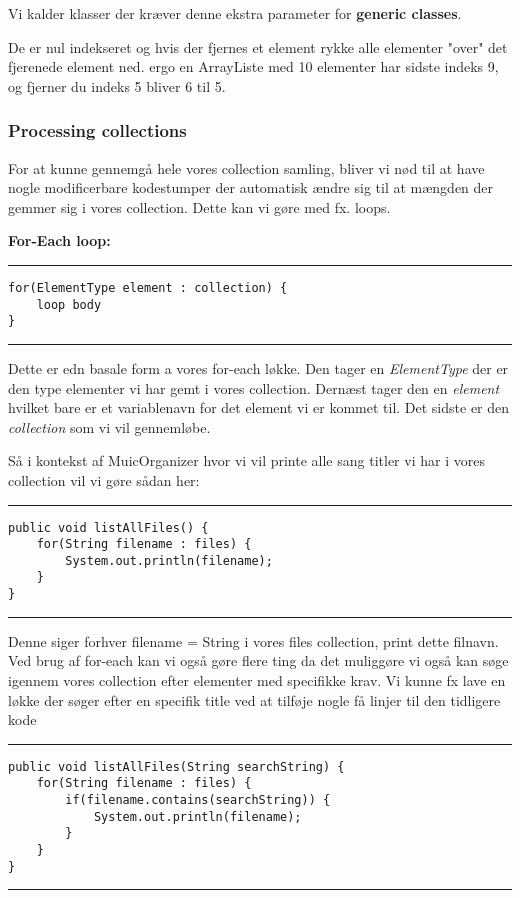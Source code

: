 \documentclass{article}
\begin{document}
Vi kalder klasser der kræver denne ekstra parameter for \textbf{generic classes}.

De er nul indekseret og hvis der fjernes et element rykke alle elementer "over" det fjerenede element ned. ergo en ArrayListe med 10 elementer har sidste indeks 9, og fjerner du indeks 5 bliver 6 til 5.

\subsubsection*{Processing collections}
For at kunne gennemgå hele vores collection samling, bliver vi nød til at have nogle modificerbare kodestumper der automatisk ændre sig til at mængden der gemmer sig i vores collection. 
Dette kan vi gøre med fx. loops.

\noindent\textbf{For-Each loop:}
\vspace{0.3em}
\hrule
\begin{verbatim}
for(ElementType element : collection) {
    loop body
}
\end{verbatim}
\hrule
\vspace{0.3em}

Dette er edn basale form a vores for-each løkke. Den tager en \textit{ElementType} der er den type elementer vi har gemt i vores collection. Dernæst tager den en \textit{element} hvilket bare er et variablenavn for det element vi er kommet til. Det sidste er den \textit{collection} som vi vil gennemløbe. 

Så i kontekst af MuicOrganizer hvor vi vil printe alle sang titler vi har i vores collection vil vi gøre sådan her:
\vspace{0.3em}
\hrule
\begin{verbatim}
public void listAllFiles() {
    for(String filename : files) {
        System.out.println(filename);
    }
}
\end{verbatim}
\hrule
\vspace{0.3em}

Denne siger forhver filename = String i vores files collection, print dette filnavn. Ved brug af for-each kan vi også gøre flere ting da det muliggøre vi også kan søge igennem vores collection efter elementer med specifikke krav. Vi kunne fx lave en løkke der søger efter en specifik title ved at tilføje nogle få linjer til den tidligere kode

\vspace{0.3em}
\hrule
\begin{verbatim}
public void listAllFiles(String searchString) {
    for(String filename : files) {
        if(filename.contains(searchString)) {
            System.out.println(filename);
        }
    }
}
\end{verbatim}
\hrule
\vspace{0.3em}
\end{document}

